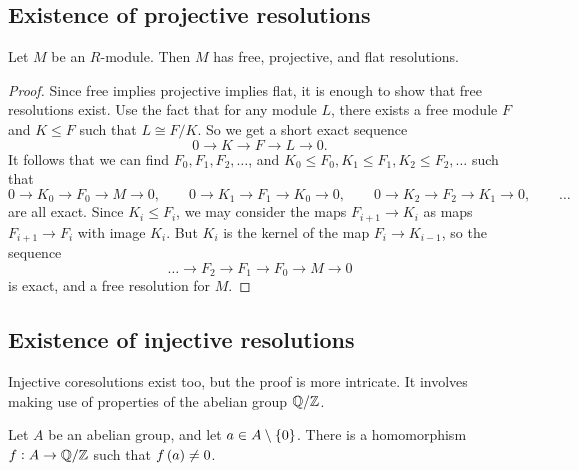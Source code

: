 \subsection{Existence of projective resolutions}

\begin{proposition}
Let $ M $ be an $ R $-module. Then $ M $ has free, projective, and flat resolutions.
\end{proposition}

\begin{proof}
Since free implies projective implies flat, it is enough to show that free resolutions exist. Use the fact that for any module $ L $, there exists a free module $ F $ and $ K \le F $ such that $ L \cong F / K $. So we get a short exact sequence
$$ 0 \to K \to F \to L \to 0. $$
It follows that we can find $ F_0, F_1, F_2, \dots $, and $ K_0 \le F_0, K_1 \le F_1, K_2 \le F_2, \dots $ such that
$$ 0 \to K_0 \to F_0 \to M \to 0, \qquad 0 \to K_1 \to F_1 \to K_0 \to 0, \qquad 0 \to K_2 \to F_2 \to K_1 \to 0, \qquad \dots $$
are all exact. Since $ K_i \le F_i $, we may consider the maps $ F_{i + 1} \to K_i $ as maps $ F_{i + 1} \to F_i $ with image $ K_i $. But $ K_i $ is the kernel of the map $ F_i \to K_{i - 1} $, so the sequence
$$ \dots \to F_2 \to F_1 \to F_0 \to M \to 0 $$
is exact, and a free resolution for $ M $.
\end{proof}

\subsection{Existence of injective resolutions}

Injective coresolutions exist too, but the proof is more intricate. It involves making use of properties of the abelian group $ \mathbb{Q} / \mathbb{Z} $.

\begin{proposition}
Let $ A $ be an abelian group, and let $ a \in A \setminus \cbr{0} $. There is a homomorphism $ f : A \to \mathbb{Q} / \mathbb{Z} $ such that $ f\br{a} \ne 0 $. %
\end{proposition}

